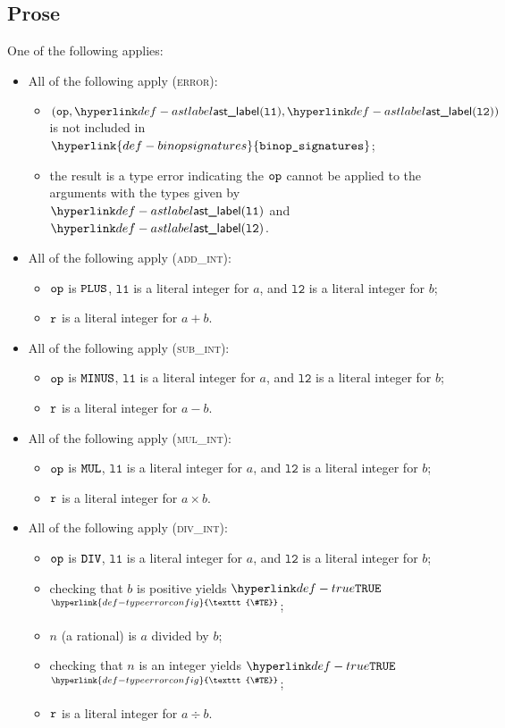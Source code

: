 \documentclass{book}
\newcommand\TypeErrorConfig[0]{\hyperlink{def-typeerrorconfig}{\texttt{\#TE}}}
\newcommand\ProseOrTypeError[0]{\hyperlink{def-proseortypeerror}{$^{\TypeErrorConfig}$}}
\newcommand\binopsignatures[0]{\hyperlink{def-binopsignatures}{\texttt{binop\_signatures}}}
\newcommand\vlone[0]{\texttt{l1}}
\newcommand\vltwo[0]{\texttt{l2}}
\begin{document}
\subsection{Prose}
One of the following applies:
\begin{itemize}
  \item All of the following apply (\textsc{error}):
  \begin{itemize}
    \item $(\op, \astlabel(\vlone), \astlabel(\vltwo))$ is not included in $\binopsignatures$;
    \item the result is a type error indicating the $\texttt{op}$ cannot be applied to the arguments
          with the types given by $\astlabel(\vlone)$ and $\astlabel(\vltwo)$.
  \end{itemize}

  \item All of the following apply (\textsc{add\_int}):
  \begin{itemize}
    \item $\texttt{op}$ is $\texttt{PLUS}$, $\vlone$ is a literal integer for $a$, and $\vltwo$ is a literal integer for $b$;
    \item $\texttt{r}$ is a literal integer for $a+b$.
  \end{itemize}

  \item All of the following apply (\textsc{sub\_int}):
  \begin{itemize}
    \item $\texttt{op}$ is $\texttt{MINUS}$, $\vlone$ is a literal integer for $a$, and $\vltwo$ is a literal integer for $b$;
    \item $\texttt{r}$ is a literal integer for $a-b$.
  \end{itemize}

  \item All of the following apply (\textsc{mul\_int}):
  \begin{itemize}
    \item $\texttt{op}$ is $\texttt{MUL}$, $\vlone$ is a literal integer for $a$, and $\vltwo$ is a literal integer for $b$;
    \item $\texttt{r}$ is a literal integer for $a\times b$.
  \end{itemize}

  \item All of the following apply (\textsc{div\_int}):
  \begin{itemize}
    \item $\texttt{op}$ is $\texttt{DIV}$, $\vlone$ is a literal integer for $a$, and $\vltwo$ is a literal integer for $b$;
    \item checking that $b$ is positive yields $\True$ \ProseOrTypeError;
    \item $n$ (a rational) is $a$ divided by $b$;
    \item checking that $n$ is an integer yields $\True$ \ProseOrTypeError;
    \item $\texttt{r}$ is a literal integer for $a\div b$.
  \end{itemize}


\end{itemize}
\end{document}
